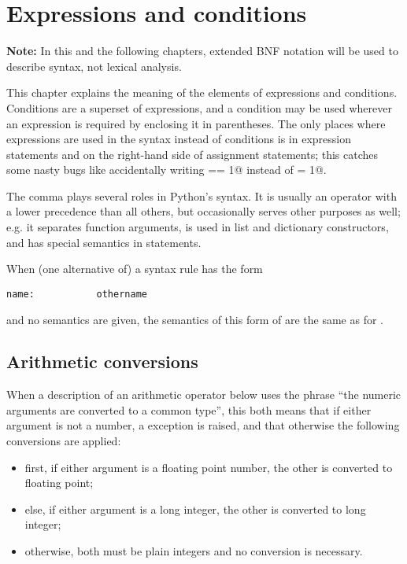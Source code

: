 \chapter{Expressions and conditions}

{\bf Note:} In this and the following chapters, extended BNF notation
will be used to describe syntax, not lexical analysis.

This chapter explains the meaning of the elements of expressions and
conditions.  Conditions are a superset of expressions, and a condition
may be used wherever an expression is required by enclosing it in
parentheses.  The only places where expressions are used in the syntax
instead of conditions is in expression statements and on the
right-hand side of assignment statements; this catches some nasty bugs
like accidentally writing \verb@x == 1@ instead of \verb@x = 1@.

The comma plays several roles in Python's syntax.  It is usually an
operator with a lower precedence than all others, but occasionally
serves other purposes as well; e.g. it separates function arguments,
is used in list and dictionary constructors, and has special semantics
in \verb@print@ statements.

When (one alternative of) a syntax rule has the form

\begin{verbatim}
name:           othername
\end{verbatim}

and no semantics are given, the semantics of this form of \verb@name@
are the same as for \verb@othername@.

\section{Arithmetic conversions}

When a description of an arithmetic operator below uses the phrase
``the numeric arguments are converted to a common type'',
this both means that if either argument is not a number, a
\verb@TypeError@ exception is raised, and that otherwise
the following conversions are applied:

\begin{itemize}
\item	first, if either argument is a floating point number,
	the other is converted to floating point;
\item	else, if either argument is a long integer,
	the other is converted to long integer;
\item	otherwise, both must be plain integers and no conversion
	is necessary.
\end{itemize}

